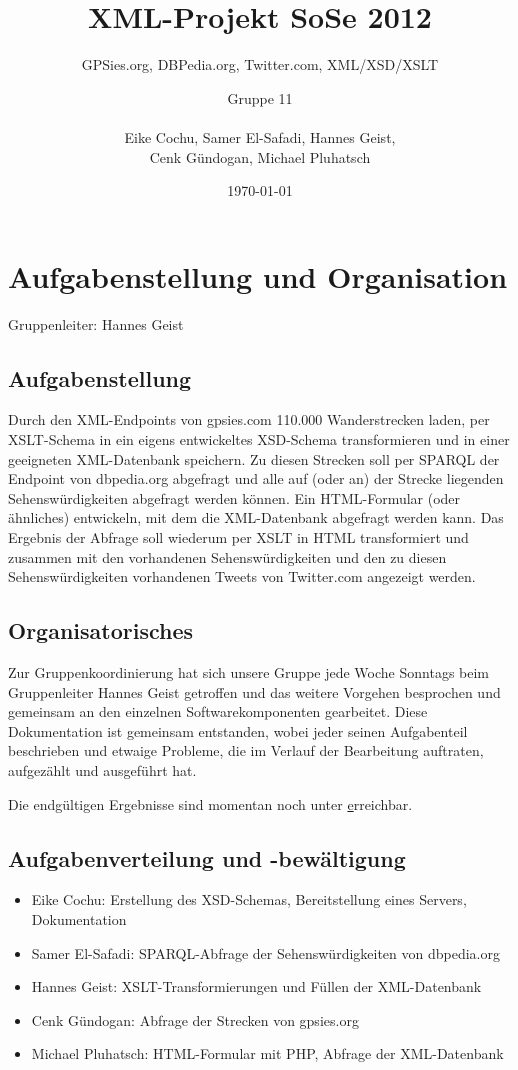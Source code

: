 \documentclass[10pt,a4paper]{scrartcl}
\title{XML-Projekt SoSe 2012}
\subtitle{GPSies.org, DBPedia.org, Twitter.com, XML/XSD/XSLT\vspace*{.7cm}}
\author{Gruppe 11\\\hfill\\Eike Cochu, Samer El-Safadi, Hannes Geist,\\Cenk Gündogan, Michael Pluhatsch}
\date{\today}
\begin{document}
\maketitle
\thispagestyle{empty}
\vspace*{2cm}
\tableofcontents
\newpage
\renewcommand{\baselinestretch}{1.5}
\selectfont

\section{Aufgabenstellung und Organisation}
Gruppenleiter: Hannes Geist

\subsection{Aufgabenstellung}
Durch den XML-Endpoints von gpsies.com 110.000 Wanderstrecken laden, per XSLT-Schema in ein eigens entwickeltes XSD-Schema transformieren und in einer geeigneten XML-Datenbank speichern. Zu diesen Strecken soll per SPARQL der Endpoint von dbpedia.org abgefragt und alle auf (oder an) der Strecke liegenden Sehenswürdigkeiten abgefragt werden können. Ein HTML-Formular (oder ähnliches) entwickeln, mit dem die XML-Datenbank abgefragt werden kann. Das Ergebnis der Abfrage soll wiederum per XSLT in HTML transformiert und zusammen mit den vorhandenen Sehenswürdigkeiten und den zu diesen Sehenswürdigkeiten vorhandenen Tweets von Twitter.com angezeigt werden.

\subsection{Organisatorisches}
Zur Gruppenkoordinierung hat sich unsere Gruppe jede Woche Sonntags beim Gruppenleiter Hannes Geist getroffen und das weitere Vorgehen besprochen und gemeinsam an den einzelnen Softwarekomponenten gearbeitet. Diese Dokumentation ist gemeinsam entstanden, wobei jeder seinen Aufgabenteil beschrieben und etwaige Probleme, die im Verlauf der Bearbeitung auftraten, aufgezählt und ausgeführt hat.

Die endgültigen Ergebnisse sind momentan noch unter \href{http://cochu.dyndns.org/xml} erreichbar.

\subsection{Aufgabenverteilung und -bewältigung}
\begin{itemize}
\item Eike Cochu: Erstellung des XSD-Schemas, Bereitstellung eines Servers, Dokumentation
\item Samer El-Safadi: SPARQL-Abfrage der Sehenswürdigkeiten von dbpedia.org
\item Hannes Geist: XSLT-Transformierungen und Füllen der XML-Datenbank
\item Cenk Gündogan: Abfrage der Strecken von gpsies.org 
\item Michael Pluhatsch: HTML-Formular mit PHP, Abfrage der XML-Datenbank
\end{itemize}
\end{document}
